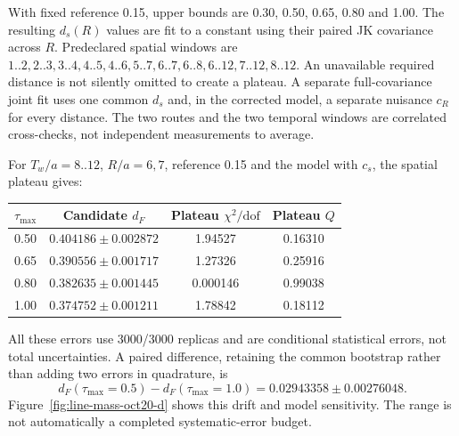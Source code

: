 \documentclass[11pt]{article}
\numberwithin{equation}{section}
\begin{document}
With fixed reference 0.15, upper bounds are 0.30, 0.50, 0.65, 0.80 and
1.00. The resulting \(d_s(R)\) values are fit to a constant using their
paired JK covariance across \(R\). Predeclared spatial windows are
\(1..2,2..3,3..4,4..5,4..6,5..7,6..7,6..8,6..12,7..12,8..12\).
An unavailable required distance is not silently omitted to create a
plateau. A separate full-covariance joint fit uses one common \(d_s\)
and, in the corrected model, a separate nuisance \(c_R\) for every
distance. The two routes and the two temporal windows are correlated
cross-checks, not independent measurements to average.

For \(T_w/a=8..12\), \(R/a=6,7\), reference 0.15 and the model with
\(c_s\), the spatial plateau gives:
\begin{center}
\small
\begin{tabular}{@{}cccc@{}}
 \toprule
 \(\tau_{\max}\) & Candidate \(d_F\) & Plateau \(\chi^2/\mathrm{dof}\) & Plateau \(Q\) \\
 \midrule
 0.50 & \(0.404186\pm0.002872\) & 1.94527 & 0.16310 \\
 0.65 & \(0.390556\pm0.001717\) & 1.27326 & 0.25916 \\
 0.80 & \(0.382635\pm0.001445\) & 0.000146 & 0.99038 \\
 1.00 & \(0.374752\pm0.001211\) & 1.78842 & 0.18112 \\
 \bottomrule
\end{tabular}
\end{center}
All these errors use 3000/3000 replicas and are conditional statistical
errors, not total uncertainties. A paired difference, retaining the common
bootstrap rather than adding two errors in quadrature, is
\begin{equation}
 d_F(\tau_{\max}=0.5)-d_F(\tau_{\max}=1.0)
 =0.02943358\pm0.00276048.
 \label{eq:line-mass-oct20-window-drift}
\end{equation}
Figure~\ref{fig:line-mass-oct20-d} shows this drift and model sensitivity.
The range is not automatically a completed systematic-error budget.
\end{document}
